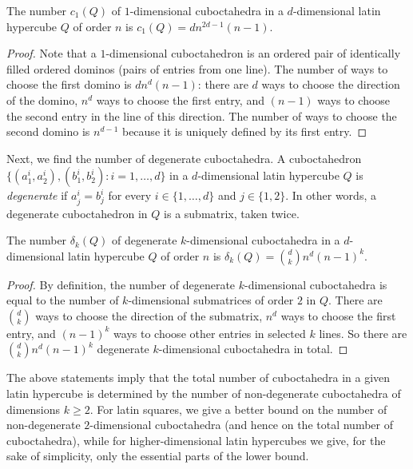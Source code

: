 \documentclass[a4paper]{article}
\begin{document}
\begin{utv} \label{1dimcub}
The number $c_1 (Q)$ of $1$-dimensional cuboctahedra in a  $d$-dimensional latin hypercube $Q$ of order $n$ is $c_1(Q) =  d n^{2d-1} (n-1)$.
\end{utv}

\begin{proof}
Note that a $1$-dimensional cuboctahedron is an ordered pair of identically filled ordered dominos (pairs of entries from one line). The number of ways to choose the first domino is   $d n^{d} (n-1)$: there are $d$ ways to choose the direction of the domino, $n^{d}$ ways to choose the first entry, and $(n-1)$ ways to choose the second entry in the line of this direction. The number of ways to choose the second domino is $n^{d-1}$ because it is uniquely defined by its first entry.  
\end{proof}


Next, we find the number of  degenerate cuboctahedra.  A cuboctahedron  $\{ (a_1^{i}, a_2^{i}), (b_1^{i}, b_2^{i}) : i = 1, \ldots, d \}$ in a $d$-dimensional latin hypercube  $Q$ is \textit{degenerate} if $a_j^i = b_j^i$ for every $ i \in  \{1, \ldots, d\}$ and $j \in \{ 1,2\}$. In other words, a degenerate cuboctahedron in $Q$ is a submatrix, taken twice. 

\begin{utv} \label{degenercub}
The number $\delta_k(Q)$ of degenerate $k$-dimensional cuboctahedra in a $d$-dimensional latin hypercube $Q$ of order $n$ is $\delta_k(Q) =  {d \choose k} n^{d} (n-1)^k$.
\end{utv}

\begin{proof}
By definition, the number  of degenerate $k$-dimensional cuboctahedra is equal to the number of $k$-dimensional submatrices of order $2$ in $Q$.  There are ${d \choose k}$ ways  to choose the direction of the submatrix, $n^{d}$ ways to choose the first entry, and $(n-1)^k$ ways to choose other entries  in selected $k$  lines. So there are  ${d \choose k} n^{d} (n-1)^k$ degenerate $k$-dimensional cuboctahedra in total. 
\end{proof}


The above statements imply that the total number of cuboctahedra in a given latin hypercube is determined by the number of non-degenerate cuboctahedra of dimensions $k \geq 2$. For latin squares, we give a better bound on the number of non-degenerate $2$-dimensional cuboctahedra (and hence on the total number of cuboctahedra), while for higher-dimensional latin hypercubes we give, for the sake of simplicity, only the essential parts of the lower bound.
\end{document}
